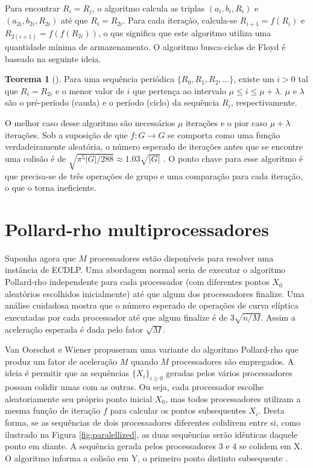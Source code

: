 Para encontrar \(R_i = R_j\), o algoritmo calcula as triplas $(a_i, b_i, R_i)$ e $(a_{2i}, b_{2i}, R_{2i})$ até que \(R_i = R_{2i}\). Para cada iteração, calcula-se \(R_{i+1} = f(R_i)\) e \(R_{2(i+1)} = f(f(R_{2i}))\), o que significa que este algoritmo utiliza uma quantidade mínima de armazenamento. O algoritmo busca-ciclos de Floyd é baseado na seguinte ideia. \cite{Ping:2011} \cite{Brent:2008}

\textbf{Teorema 1} (\cite{Knuth:1997}). Para uma sequência periódica \(\{R_0, R_1, R_2, ...\}\), existe um \(i > 0\) tal que \(R_i = R_{2i}\) e o menor valor de \(i\) que pertença ao intervalo \(\mu \leq i \leq \mu + \lambda\). \(\mu\) e \(\lambda\) são o pré-período (cauda) e o período (ciclo) da sequência \(R_i\), respectivamente.

O melhor caso desse algoritmo são necessários \(\mu\) iterações e o pior caso \(\mu + \lambda\) iterações. Sob a suposição de que \(f : G \to G\) se comporta como uma função verdadeiramente aleatória, o número esperado de iterações antes que se encontre uma colisão é de $\sqrt{\pi^5 |G|/288} \approx 1.03 \sqrt{|G|}$ \cite{Brent:2008}. O ponto chave para esse algoritmo é que precisa-se de três operações de grupo e uma comparação para cada iteração, o que o torna ineficiente.

%
%
\section{Pollard-rho multiprocessadores} \label{sec:parallelized}
Suponha agora que \(M\) processadores estão disponíveis para resolver uma instância de ECDLP. Uma abordagem normal seria de executar o algoritmo Pollard-rho independente para cada processador (com diferentes pontos \(X_0\) aleatórios escolhidos inicialmente) até que algum dos processadores finalize. Uma análise cuidadosa mostra que o número esperado de operações de curva elíptica executadas por cada processador até que algum finalize é de $3\sqrt{n/M}$. Assim a aceleração esperada é dada pelo fator $\sqrt{M}$. \cite{Guide}

Van Oorschot e Wiener propuseram uma variante do algoritmo Pollard-rho que produz um fator de aceleração \(M\) quando \(M\) processadores são empregados. A ideia é permitir que as sequências $\{X_i\}_{i \geq 0}$ geradas pelos vários processadores possam colidir umas com as outras. Ou seja, cada processador escolhe aleatoriamente seu próprio ponto inicial \(X_0\), mas todos processadores utilizam a mesma função de iteração \(f\) para calcular os pontos subsequentes \(X_i\). Desta forma, se as sequências de dois processadores diferentes colidirem entre si, como ilustrado na Figura \ref{fig:paralellized}, as duas sequências serão idênticas daquele ponto em diante. A sequência gerada pelos processadores 3 e 4 se colidem em X. O algoritmo informa a colisão em Y, o primeiro ponto distinto subsequente \cite{Van:1996}.


